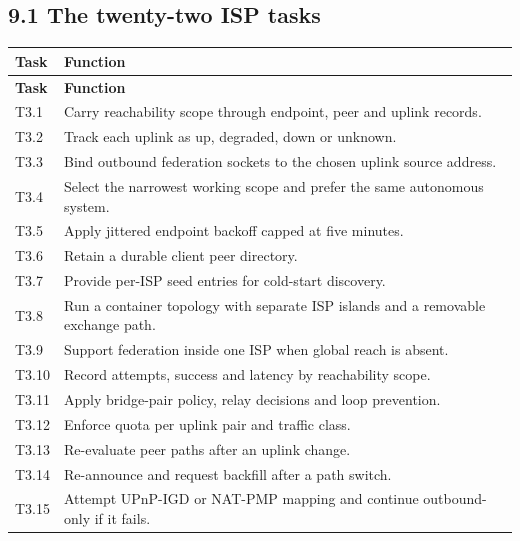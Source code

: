 \documentclass[12pt,a4paper]{article}
\begin{document}
\subsection*{9.1 The twenty-two ISP tasks}
\begin{small}
\begin{longtable}{@{}>{\raggedright\arraybackslash}p{}>{\raggedright\arraybackslash}p{}@{}}
\toprule
\textbf{Task} & \textbf{Function} \\
\midrule
\endfirsthead
\toprule
\textbf{Task} & \textbf{Function} \\
\midrule
\endhead
\bottomrule
\endfoot
T3.1 & Carry reachability scope through endpoint, peer and uplink records. \\
\addlinespace[2pt]
T3.2 & Track each uplink as up, degraded, down or unknown. \\
\addlinespace[2pt]
T3.3 & Bind outbound federation sockets to the chosen uplink source address. \\
\addlinespace[2pt]
T3.4 & Select the narrowest working scope and prefer the same autonomous system. \\
\addlinespace[2pt]
T3.5 & Apply jittered endpoint backoff capped at five minutes. \\
\addlinespace[2pt]
T3.6 & Retain a durable client peer directory. \\
\addlinespace[2pt]
T3.7 & Provide per-ISP seed entries for cold-start discovery. \\
\addlinespace[2pt]
T3.8 & Run a container topology with separate ISP islands and a removable exchange path. \\
\addlinespace[2pt]
T3.9 & Support federation inside one ISP when global reach is absent. \\
\addlinespace[2pt]
T3.10 & Record attempts, success and latency by reachability scope. \\
\addlinespace[2pt]
T3.11 & Apply bridge-pair policy, relay decisions and loop prevention. \\
\addlinespace[2pt]
T3.12 & Enforce quota per uplink pair and traffic class. \\
\addlinespace[2pt]
T3.13 & Re-evaluate peer paths after an uplink change. \\
\addlinespace[2pt]
T3.14 & Re-announce and request backfill after a path switch. \\
\addlinespace[2pt]
T3.15 & Attempt UPnP-IGD or NAT-PMP mapping and continue outbound-only if it fails. \\

\end{longtable}
\end{small}
\end{document}
